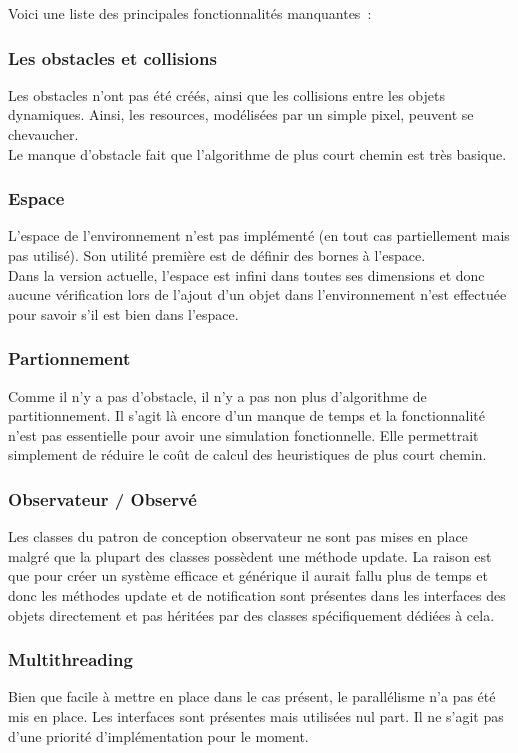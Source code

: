 Voici une liste des principales fonctionnalités manquantes~:
\subsubsection{Les obstacles et collisions}

Les obstacles n'ont pas été créés, ainsi que les collisions entre les objets dynamiques. Ainsi, les resources, modélisées par un simple pixel, peuvent se chevaucher.\\
Le manque d'obstacle fait que l'algorithme de plus court chemin est très basique.

\subsubsection{Espace}
L'espace de l'environnement n'est pas implémenté (en tout cas partiellement mais pas utilisé). Son utilité première est de définir des bornes à l'espace.\\
Dans la version actuelle, l'espace est infini dans toutes ses dimensions et donc aucune vérification lors de l'ajout d'un objet dans l'environnement n'est effectuée pour savoir s'il est bien dans l'espace.

\subsubsection{Partionnement}
Comme il n'y a pas d'obstacle, il n'y a pas non plus d'algorithme de partitionnement. Il s'agit là encore d'un manque de temps et la fonctionnalité n'est pas essentielle pour avoir une simulation fonctionnelle. Elle permettrait simplement de réduire le coût de calcul des heuristiques de plus court chemin.

\subsubsection{Observateur / Observé}

Les classes du patron de conception observateur ne sont pas mises en place malgré que la plupart des classes possèdent une méthode update. La raison est que pour créer un système efficace et générique il aurait fallu plus de temps et donc les méthodes update et de notification sont présentes dans les interfaces des objets directement et pas héritées par des classes spécifiquement dédiées à cela.

\subsubsection{Multithreading}
Bien que facile à mettre en place dans le cas présent, le parallélisme n'a pas été mis en place. Les interfaces sont présentes mais utilisées nul part. Il ne s'agit pas d'une priorité d'implémentation pour le moment.

